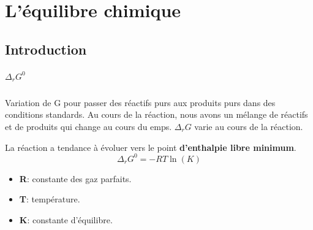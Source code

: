 \documentclass[10pt,a4paper]{book}
\newcommand{\x}{$\times$ }
\begin{document}
\chapter{L’équilibre chimique}

\section{Introduction}

\paragraph{\(\Delta_rG^0\)} Variation de G pour passer des réactifs purs aux produits purs dans des conditions standards. Au cours de la réaction, nous avons un mélange de réactifs et de produits qui change au cours du emps. \(\Delta_rG\) varie au cours de la réaction. \par
La réaction a tendance à évoluer vers le point \textbf{d’enthalpie libre minimum}.
\[\Delta_rG^0 = -RT\ln(K)\] \label{eq:GR0}
\begin{itemize}
\item \textbf{R}: constante des gaz parfaits.
\item \textbf{T}: température.
\item \textbf{K}: constante d’équilibre.
\end{itemize}
\end{document}

